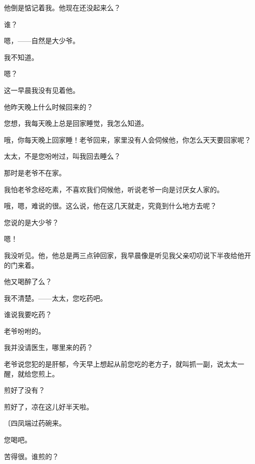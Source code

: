 他倒是惦记着我。他现在还没起来么？

谁？

嗯，——自然是大少爷。

我不知道。

嗯？

这一早晨我没有见着他。

他昨天晚上什么时候回来的？

您想，我每天晚上总是回家睡觉，我怎么知道。

哦，你每天晚上回家睡！老爷回来，家里没有人会伺候他，你怎么天天要回家呢？

太太，不是您吩咐过，叫我回去睡么？

那时是老爷不在家。

我怕老爷念经吃素，不喜欢我们伺候他，听说老爷一向是讨厌女人家的。

哦，嗯，难说的很。这么说，他在这几天就走，究竟到什么地方去呢？

您说的是大少爷？

嗯！

我没听见。他，他总是两三点钟回家，我早晨像是听见我父亲叨叨说下半夜给他开的门来着。

他又喝醉了么？

我不清楚。——太太，您吃药吧。

谁说我要吃药？

老爷吩咐的。

我并没请医生，哪里来的药？

老爷说您犯的是肝郁，今天早上想起从前您吃的老方子，就叫抓一副，说太太一醒，就给您煎上。

煎好了没有？

煎好了，凉在这儿好半天啦。

{\fangsong〔四凤端过药碗来。}

您喝吧。

苦得很。谁煎的？

